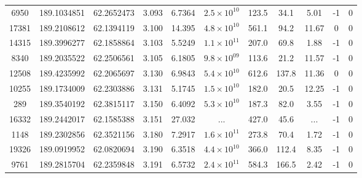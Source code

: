 \begin{table}
\begin{tabular}{ccccccccccc}
       6950 &                  189.1034851 &                 62.2652473 &          3.093 &           6.7364 & $2.5\times10^{10}$ &          123.5 &        34.1 &        5.01 &               -1 &                  0 \\
      17381 &                  189.2108612 &                 62.1394119 &          3.100 &           14.395 & $4.8\times10^{10}$ &          561.1 &        94.2 &       11.67 &                0 &                  0 \\
      14315 &                  189.3996277 &                 62.1858864 &          3.103 &           5.5249 & $1.1\times10^{11}$ &          207.0 &        69.8 &        1.88 &               -1 &                  0 \\
       8340 &                  189.2035522 &                 62.2506561 &          3.105 &           6.1805 & $9.8\times10^{09}$ &          113.6 &        21.2 &       11.57 &               -1 &                  0 \\
      12508 &                  189.4235992 &                 62.2065697 &          3.130 &           6.9843 & $5.4\times10^{10}$ &          612.6 &       137.8 &       11.36 &                0 &                  0 \\
      10255 &                  189.1734009 &                 62.2303886 &          3.131 &           5.1745 & $1.5\times10^{10}$ &          182.0 &        20.5 &       12.25 &               -1 &                  0 \\
        289 &                  189.3540192 &                 62.3815117 &          3.150 &           6.4092 & $5.3\times10^{10}$ &          187.3 &        82.0 &        3.55 &               -1 &                  0 \\
      16332 &                  189.2442017 &                 62.1585388 &          3.151 &           27.032 &                ... &          427.0 &        45.6 &         ... &               -1 &                  0 \\
       1148 &                  189.2302856 &                 62.3521156 &          3.180 &           7.2917 & $1.6\times10^{11}$ &          273.8 &        70.4 &        1.72 &               -1 &                  0 \\
      19326 &                  189.0919952 &                 62.0820694 &          3.190 &           6.3518 & $4.4\times10^{10}$ &          366.0 &       112.4 &        8.35 &               -1 &                  0 \\
       9761 &                  189.2815704 &                 62.2359848 &          3.191 &           6.5732 & $2.4\times10^{11}$ &          584.3 &       166.5 &        2.42 &               -1 &                  0 \\

\end{tabular}
\end{table}
